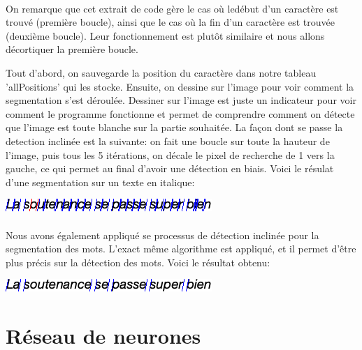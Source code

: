 \documentclass{article}
\begin{document}
    \paragraph{}
    On remarque que cet extrait de code gère le cas où ledébut d'un caractère est trouvé (première boucle), ainsi que le cas où la fin d'un caractère est trouvée (deuxième boucle). Leur fonctionnement est plutôt similaire et nous allons décortiquer la première boucle.
    \par Tout d'abord, on sauvegarde la position du caractère dans notre tableau 'allPositions' qui les stocke. Ensuite, on dessine sur l'image pour voir comment la segmentation s'est déroulée. Dessiner sur l'image est juste un indicateur pour voir comment le programme fonctionne et permet de comprendre comment on détecte que l'image est toute blanche sur la partie souhaitée. La façon dont se passe la detection inclinée est la suivante: on fait une boucle sur toute la hauteur de l'image, puis tous les 5 itérations, on décale le pixel de recherche de 1 vers la gauche, ce qui permet au final d'avoir une détection en biais. Voici le résulat d'une segmentation sur un texte en italique: \\

    \begin{center}
		\includegraphics[scale=0.35]{italicChars.bmp}
	\end{center}

    \paragraph{}
    Nous avons également appliqué se processus de détection inclinée pour la segmentation des mots. L'exact même algorithme est appliqué, et il permet d'être plus précis sur la détection des mots. Voici le résultat obtenu: \\

    \begin{center}
		\includegraphics[scale=0.35]{wordItalic.bmp}
	\end{center}
	
\newpage

\section{Réseau de neurones}
\end{document}
